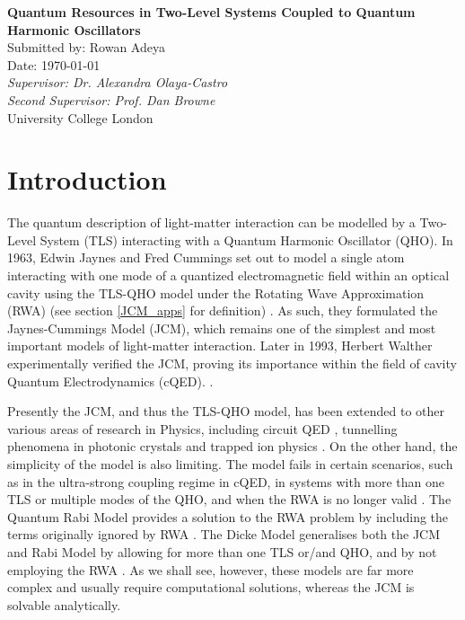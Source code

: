 \documentclass[12pt,a4paper]{article}
\begin{document}
\begin{titlepage}
    \centering
    \vspace*{2cm}
    \Huge\textbf{Quantum Resources in Two-Level Systems Coupled to Quantum Harmonic Oscillators} \\
    \vspace{1cm}
    \small{Submitted by: Rowan Adeya \\
    Date: \today} \\
    \vspace{1cm}
    \small{\textit{Supervisor: Dr. Alexandra Olaya-Castro}} \\
    \small{\textit{Second Supervisor: Prof. Dan Browne}} \\
    

    \vfill
    \normalsize
    University College London
\end{titlepage}

\tableofcontents

\newpage

\section{Introduction} \label{intro}
The quantum description of light-matter interaction can be modelled by a Two-Level System (TLS) interacting with a Quantum Harmonic Oscillator (QHO). In 1963, Edwin Jaynes and Fred Cummings set out to model a single atom interacting with one mode of a quantized electromagnetic field within an optical cavity using the TLS-QHO model under the Rotating Wave Approximation (RWA) (see section \ref{JCM_apps} for definition) \cite{Context1963-JC_Original}. As such, they formulated the Jaynes-Cummings Model (JCM), which remains one of the simplest and most important models of light-matter interaction. Later in 1993, Herbert Walther experimentally verified the JCM, proving its importance within the field of cavity Quantum Electrodynamics (cQED). \cite{Context1993-JC_Verification}. 




Presently the JCM, and thus the TLS-QHO model, has been extended to other various areas of research in Physics, including circuit QED \cite{Context2018-Supercond_qubit}, tunnelling phenomena in photonic crystals \cite{Context2012-Tunneling_photons} and trapped ion physics \cite{Context1992-Trapped_ions}. On the other hand, the simplicity of the model is also limiting. The model fails in certain scenarios, such as in the ultra-strong coupling regime in cQED, in systems with more than one TLS or multiple modes of the QHO, and when the RWA is no longer valid \cite{General2024-JC_overview}. The Quantum Rabi Model provides a solution to the RWA problem by including the terms originally ignored by RWA \cite{General2024-JC_overview}. The Dicke Model generalises both the JCM and Rabi Model by allowing for more than one TLS or/and QHO, and by not employing the RWA \cite{General2024-JC_overview}. As we shall see, however, these models are far more complex and usually require computational solutions, whereas the JCM is solvable analytically. 
\end{document}
